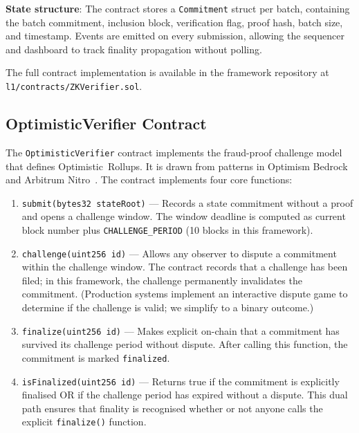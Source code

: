 \textbf{State structure}: The contract stores a \texttt{Commitment} struct per batch, containing the batch commitment, inclusion block, verification flag, proof hash, batch size, and timestamp. Events are emitted on every submission, allowing the sequencer and dashboard to track finality propagation without polling.

The full contract implementation is available in the framework repository at \texttt{l1/contracts/ZKVerifier.sol}.

\subsection{OptimisticVerifier Contract}

The \texttt{OptimisticVerifier} contract implements the fraud-proof challenge model that defines Optimistic~Rollups. It is drawn from patterns in Optimism Bedrock~\cite{optimism2023bedrock} and Arbitrum Nitro~\cite{nitro2023}. The contract implements four core functions:

\begin{enumerate}
    \item \texttt{submit(bytes32 stateRoot)} — Records a state commitment without a proof and opens a challenge window. The window deadline is computed as current block number plus \texttt{CHALLENGE\_PERIOD} (10 blocks in this framework).

    \item \texttt{challenge(uint256 id)} — Allows any observer to dispute a commitment within the challenge window. The contract records that a challenge has been filed; in this framework, the challenge permanently invalidates the commitment. (Production systems implement an interactive dispute game to determine if the challenge is valid; we simplify to a binary outcome.)

    \item \texttt{finalize(uint256 id)} — Makes explicit on-chain that a commitment has survived its challenge period without dispute. After calling this function, the commitment is marked \texttt{finalized}.

    \item \texttt{isFinalized(uint256 id)} — Returns true if the commitment is explicitly finalised OR if the challenge period has expired without a dispute. This dual path ensures that finality is recognised whether or not anyone calls the explicit \texttt{finalize()} function.
\end{enumerate}

